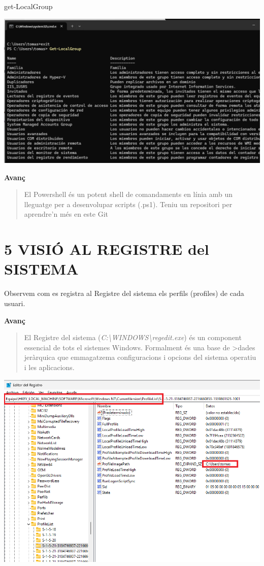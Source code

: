 \documentclass[
  a4paper,
]{article}
\newenvironment{Shaded}{\begin{snugshade}}{\end{snugshade}}
\newcommand{\NormalTok}[1]{#1}
\begin{document}
\begin{Shaded}
\begin{Highlighting}[]
\NormalTok{get{-}LocalGroup}
\end{Highlighting}
\end{Shaded}

\includegraphics{png/get-LocalGroup.png}

\textbf{Avanç}

\begin{quote}
El Powershell és un potent shell de comandaments en línia amb un
lleguatge per a desenvolupar scripts (.ps1). Teniu un repositori per
aprendre'n més en este Git
\end{quote}

\section{5 VISIÓ AL REGISTRE del
SISTEMA}\label{visiuxf3-al-registre-del-sistema}

Observem com es registra al Registre del sistema els perfils (profiles)
de cada usuari.

\textbf{Avanç}

\begin{quote}
El Registre del sistema
(\emph{C:\textbackslash WINDOWS\textbackslash regedit.exe}) és un
component essencial de tots el sistemes Windows. Formalment és una base
de \textgreater dades jeràrquica que emmagatzema configuracions i
opcions del sistema operatiu i les aplicacions.
\end{quote}

\includegraphics{png/regedit.png}
\end{document}
